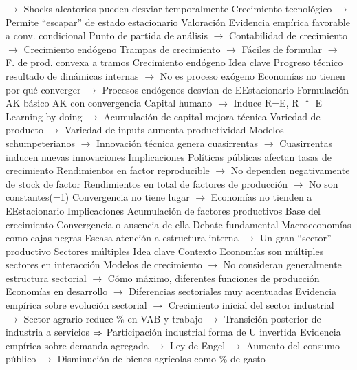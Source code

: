 \documentclass{nuevotema}
\begin{document}
\begin{esquemal}
				\4[] $\to$ Shocks aleatorios pueden desviar temporalmente
				\4[] Crecimiento tecnológico
				\4[] $\to$ Permite ``escapar'' de estado estacionario
				\4 Valoración
				\4[] Evidencia empírica favorable a conv. condicional
				\4[] Punto de partida de análisis
				\4[] $\to$ Contabilidad de crecimiento
				\4[] $\to$ Crecimiento endógeno
				\4[] Trampas de crecimiento
				\4[] $\to$ Fáciles de formular
				\4[] $\to$ F. de prod. convexa a tramos
			\3 Crecimiento endógeno
				\4 Idea clave
				\4[] Progreso técnico resultado de dinámicas internas
				\4[] $\to$ No es proceso exógeno
				\4[] Economías no tienen por qué converger
				\4[] $\to$ Procesos endógenos desvían de EEstacionario
				\4 Formulación
				\4[] AK básico
				\4[] AK con convergencia
				\4[] Capital humano
				\4[] $\to$ Induce R=E, R $\uparrow$ E
				\4[] Learning-by-doing
				\4[] $\to$ Acumulación de capital mejora técnica
				\4[] Variedad de producto
				\4[] $\to$ Variedad de inputs aumenta productividad
				\4[] Modelos schumpeterianos
				\4[] $\to$ Innovación técnica genera cuasirrentas
				\4[] $\to$ Cuasirrentas inducen nuevas innovaciones
				\4 Implicaciones
				\4[] Políticas públicas afectan tasas de crecimiento
				\4[] Rendimientos en factor reproducible
				\4[] $\to$ No dependen negativamente de stock de factor
				\4[] Rendimientos en total de factores de producción
				\4[] $\to$ No son constantes(=1)
				\4[] Convergencia no tiene lugar
				\4[] $\to$ Economías no tienden a EEstacionario
			\3 Implicaciones
				\4 Acumulación de factores productivos
				\4[] Base del crecimiento
				\4 Convergencia o ausencia de ella
				\4[] Debate fundamental
				\4 Macroeconomías como cajas negras
				\4[] Escasa atención a estructura interna
				\4[] $\to$ Un gran ``sector'' productivo
		\2 Sectores múltiples
			\3 Idea clave
				\4 Contexto
				\4[] Economías son múltiples sectores en interacción
				\4[] Modelos de crecimiento
				\4[] $\to$ No consideran generalmente estructura sectorial
				\4[] $\to$ Cómo máximo, diferentes funciones de producción
				\4[] Economías en desarrollo
				\4[] $\to$ Diferencias sectoriales muy acentuadas
				\4[] Evidencia empírica sobre evolución sectorial
				\4[] $\to$ Crecimiento inicial del sector industrial
				\4[] $\to$ Sector agrario reduce \% en VAB y trabajo
				\4[] $\to$ Transición posterior de industria a servicios
				\4[] $\Rightarrow$ Participación industrial forma de U invertida
				\4[] Evidencia empírica sobre demanda agregada
				\4[] $\to$ Ley de Engel
				\4[] $\to$ Aumento del consumo público
				\4[] $\to$ Disminución de bienes agrícolas como \% de gasto

\end{esquemal}
\end{document}
